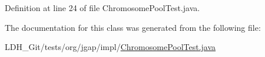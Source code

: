 Definition at line 24 of file Chromosome\-Pool\-Test.\-java.



The documentation for this class was generated from the following file\-:\begin{DoxyCompactItemize}
\item 
L\-D\-H\-\_\-\-Git/tests/org/jgap/impl/\hyperlink{_chromosome_pool_test_8java}{Chromosome\-Pool\-Test.\-java}\end{DoxyCompactItemize}

